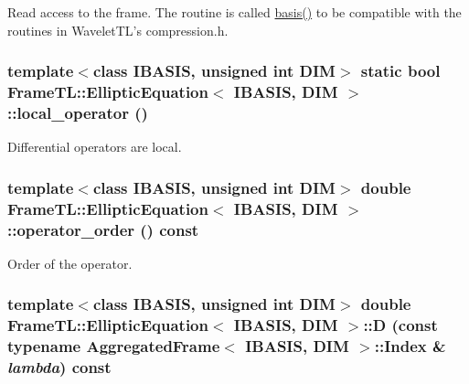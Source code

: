 Read access to the frame. The routine is called \hyperlink{classFrameTL_1_1EllipticEquation_f3c3552134fe3d41c4d4d00b13130381}{basis()} to be compatible with the routines in WaveletTL's compression.h. \hypertarget{classFrameTL_1_1EllipticEquation_ca8c08093d2faeac98f8cfae67468f36}{
\subsubsection[local\_\-operator]{\setlength{\rightskip}{0pt plus 5cm}template$<$class IBASIS, unsigned int DIM$>$ static bool {\bf FrameTL::EllipticEquation}$<$ IBASIS, DIM $>$::local\_\-operator ()}}
\label{classFrameTL_1_1EllipticEquation_ca8c08093d2faeac98f8cfae67468f36}


Differential operators are local. \hypertarget{classFrameTL_1_1EllipticEquation_a5b30bbacf5d024873268eb979e65748}{
\subsubsection[operator\_\-order]{\setlength{\rightskip}{0pt plus 5cm}template$<$class IBASIS, unsigned int DIM$>$ double {\bf FrameTL::EllipticEquation}$<$ IBASIS, DIM $>$::operator\_\-order () const}}
\label{classFrameTL_1_1EllipticEquation_a5b30bbacf5d024873268eb979e65748}


Order of the operator. \hypertarget{classFrameTL_1_1EllipticEquation_f7c320c54b0fb68c152af4cad0ef1848}{
\subsubsection[D]{\setlength{\rightskip}{0pt plus 5cm}template$<$class IBASIS, unsigned int DIM$>$ double {\bf FrameTL::EllipticEquation}$<$ IBASIS, DIM $>$::D (const typename {\bf AggregatedFrame}$<$ IBASIS, DIM $>$::{\bf Index} \& {\em lambda}) const}}
\label{classFrameTL_1_1EllipticEquation_f7c320c54b0fb68c152af4cad0ef1848}


